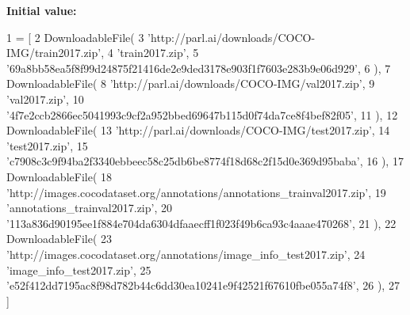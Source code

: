 {\bfseries Initial value\+:}
\begin{DoxyCode}
1 =  [
2     DownloadableFile(
3         \textcolor{stringliteral}{'http://parl.ai/downloads/COCO-IMG/train2017.zip'},
4         \textcolor{stringliteral}{'train2017.zip'},
5         \textcolor{stringliteral}{'69a8bb58ea5f8f99d24875f21416de2e9ded3178e903f1f7603e283b9e06d929'},
6     ),
7     DownloadableFile(
8         \textcolor{stringliteral}{'http://parl.ai/downloads/COCO-IMG/val2017.zip'},
9         \textcolor{stringliteral}{'val2017.zip'},
10         \textcolor{stringliteral}{'4f7e2ccb2866ec5041993c9cf2a952bbed69647b115d0f74da7ce8f4bef82f05'},
11     ),
12     DownloadableFile(
13         \textcolor{stringliteral}{'http://parl.ai/downloads/COCO-IMG/test2017.zip'},
14         \textcolor{stringliteral}{'test2017.zip'},
15         \textcolor{stringliteral}{'c7908c3c9f94ba2f3340ebbeec58c25db6be8774f18d68c2f15d0e369d95baba'},
16     ),
17     DownloadableFile(
18         \textcolor{stringliteral}{'http://images.cocodataset.org/annotations/annotations\_trainval2017.zip'},
19         \textcolor{stringliteral}{'annotations\_trainval2017.zip'},
20         \textcolor{stringliteral}{'113a836d90195ee1f884e704da6304dfaaecff1f023f49b6ca93c4aaae470268'},
21     ),
22     DownloadableFile(
23         \textcolor{stringliteral}{'http://images.cocodataset.org/annotations/image\_info\_test2017.zip'},
24         \textcolor{stringliteral}{'image\_info\_test2017.zip'},
25         \textcolor{stringliteral}{'e52f412dd7195ac8f98d782b44c6dd30ea10241e9f42521f67610fbe055a74f8'},
26     ),
27 ]
\end{DoxyCode}
